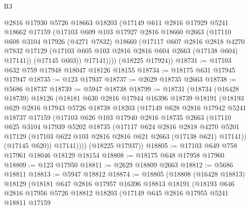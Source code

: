 \begin{lexlean}{R3}
\begin{coremodule}
          @2816
          @17930
          @5726
          @18663
          @18203
          (@17149
            @611
            @2816
            @17929
            @5241
            @18662
            @17159
            (@17103
              @609
              @103
              @17927
              @2816
              @18660
              @2663
              (@17110
                @608
                @3104
                @17926
                (@4271 @7832)
                @18660
                (@17117
                  @607
                  @2816
                  @2818
                  @4270
                  @7832
                  @17129
                  (@17103 @605 @103 @2816 @2816 @604 @2663 (@17138 @604) @17141))
                (@17145 @603))
              @17141))))
      (@18225 @17924))
@18731 := @17103 @632 @759 @17948 @18047 @18126 @18155
@18734 := @18175 @631 @17945 @17947
@18735 := @123 @17937
@18737 := @2629 @18735 @2663
@18738 := @5686 @18737
@18739 := @5947 @18738
@18799 := @18731
    (@18734
      (@16428 @18739)
      @18126
      (@18181
        @630
        @2816
        @17944
        @16396
        @18739
        @18191
        (@18193
          @629
          @2816
          @17943
          @5726
          @18738
          @18203
          (@17149
            @628
            @2816
            @17942
            @5241
            @18737
            @17159
            (@17103
              @626
              @103
              @17940
              @2816
              @18735
              @2663
              (@17110
                @625
                @3104
                @17939
                @5202
                @18735
                (@17117
                  @624
                  @2816
                  @2818
                  @4270
                  @5201
                  @17129
                  (@17103 @622 @103 @2816 @2816 @621 @2663 (@17138 @621) @17141))
                (@17145 @620))
              @17141))))
      (@18225 @17937))
@18805 := @17103 @649 @758 @17961 @18046 @18129 @18154
@18808 := @18175 @648 @17958 @17960
@18809 := @123 @17950
@18811 := @2629 @18809 @2663
@18812 := @5686 @18811
@18813 := @5947 @18812
@18874 := @18805
    (@18808
      (@16428 @18813)
      @18129
      (@18181
        @647
        @2816
        @17957
        @16396
        @18813
        @18191
        (@18193
          @646
          @2816
          @17956
          @5726
          @18812
          @18203
          (@17149
            @645
            @2816
            @17955
            @5241
            @18811
            @17159

\end{coremodule}
\end{lexlean}
